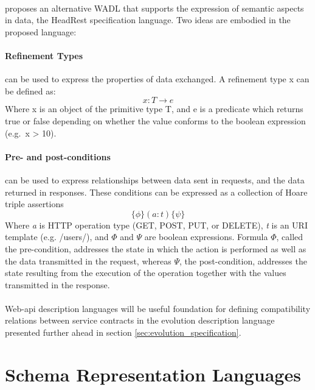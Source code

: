 \paragraph{}

\citeauthor{headRest} \cite{headRest} proposes an alternative WADL that supports the expression of semantic aspects in data, the HeadRest specification language.
Two ideas are embodied in the proposed language:

\paragraph{Refinement Types} \cite{freeman1991refinement} can be used to express the properties of data exchanged.
A refinement type x can be defined as:
\[ x:T \rightarrow e \]
Where x is an object of the primitive type T, and e is a predicate which returns true or false depending on whether the value conforms to the boolean expression (e.g.\ x > 10).

\paragraph{Pre- and post-conditions} can be used to express relationships between data sent in
requests, and the data returned in responses. These conditions can be expressed as a collection of Hoare triple assertions
\[ \{\phi\} (a : t) \{\psi\} \]
Where \emph{a} is HTTP operation type (GET, POST, PUT, or DELETE), \emph{t} is an URI template (e.g. /users/), and $\Phi$ and $\Psi$ are boolean expressions.
Formula $\Phi$, called the pre-condition, addresses the state in which the action is performed as well as the data transmitted in the request,
whereas $\Psi$, the post-condition, addresses the state resulting from the execution of the operation together with the values transmitted in the response.

\paragraph{}

Web-api description languages will be useful foundation for defining compatibility relations between service contracts in the evolution description language
presented further ahead in section \ref{sec:evolution_specification}.

\section{Schema Representation Languages} %
\label{sec:schema_representation_languages}

